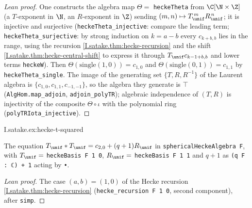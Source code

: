 \begin{proof}[Lean proof]
One constructs the algebra map $\Theta=$ \texttt{heckeTheta} from $\C[\N\times\Z]$ (a $T$-exponent in $\N$, an $R$-exponent in $\Z$) sending $(m,n)\mapsto T_\unif^{\,m}R_\unif^{\,n}$; it is injective and surjective (\texttt{heckeTheta\_injective}: compare the leading term; \texttt{heckeTheta\_surjective}: by strong induction on $k=a-b$ every $c_{k+b,b}$ lies in the range, using the recursion \cref{I.satake.thm:hecke-recursion} and the shift \cref{I.satake.thm:hecke-central-shift} to express it through $T_\unif c_{k-1+b,b}$ and lower terms \texttt{heckeW}). Then $\Theta(\mathrm{single}(1,0))=c_{1,0}$ and $\Theta(\mathrm{single}(0,1))=c_{1,1}$ by \texttt{heckeTheta\_single}. The image of the generating set $\{T,R,R^{-1}\}$ of the Laurent algebra is $\{c_{1,0},c_{1,1},c_{-1,-1}\}$, so the algebra they generate is $\top$ (\texttt{AlgHom.map\_adjoin}, \texttt{adjoin\_polyTR}); algebraic independence of $(T,R)$ is injectivity of the composite $\Theta\circ\iota$ with the polynomial ring (\texttt{polyTRIota\_injective}).
\end{proof}

\begin{example}
\end{example}
\begin{tfformal}{I.satake.ex:hecke-t-squared}
\begin{tffidelity}
The equation $T_\unif*T_\unif=c_{2,0}+(q+1)R_\unif$ in \texttt{sphericalHeckeAlgebra F}, with $T_\unif=$ \texttt{heckeBasis F 1 0}, $R_\unif=$ \texttt{heckeBasis F 1 1} and $q+1$ as \texttt{(q F : ℂ) + 1} acting by \texttt{•}.
\end{tffidelity}
\end{tfformal}
\begin{proof}[Lean proof]
The case $(a,b)=(1,0)$ of the Hecke recursion \cref{I.satake.thm:hecke-recursion} (\texttt{hecke\_recursion F 1 0}, second component), after \texttt{simp}.
\end{proof}


